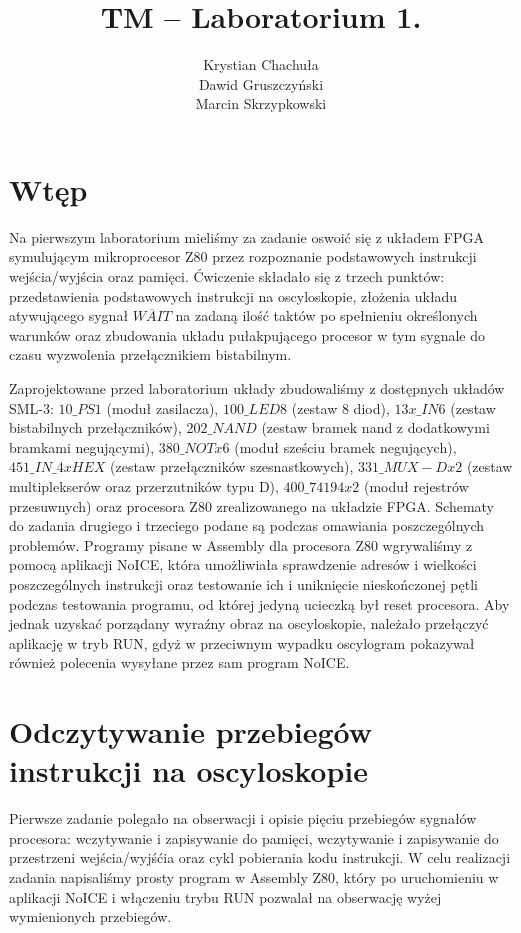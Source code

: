 \documentclass[fleqn]{article}
\title{TM -- Laboratorium 1.}
\author{Krystian Chachuła \\ Dawid Gruszczyński \\ Marcin Skrzypkowski}
\begin{document}
\maketitle

\setcounter{page}{0}
\thispagestyle{empty}

\pagebreak

\setcounter{page}{1}

\section{Wtęp}

Na pierwszym laboratorium mieliśmy za zadanie oswoić się z układem FPGA symulującym mikroprocesor Z80 przez rozpoznanie podstawowych instrukcji wejścia/wyjścia oraz pamięci. Ćwiczenie składało się z trzech punktów: przedstawienia podstawowych instrukcji na oscyloskopie, złożenia układu atywującego sygnał $\overline{WAIT}$ na zadaną ilość taktów po spełnieniu określonych warunków oraz zbudowania układu pułakpującego procesor w tym sygnale do czasu wyzwolenia przełącznikiem bistabilnym.

Zaprojektowane przed laboratorium układy zbudowaliśmy z dostępnych układów SML-3: ${10\_PS1}$ (moduł zasilacza), ${100\_LED8}$ (zestaw 8 diod), ${13x\_IN6}$ (zestaw bistabilnych przełączników), ${202\_NAND}$ (zestaw bramek nand z dodatkowymi bramkami negującymi), ${380\_NOTx6}$ (moduł sześciu bramek negujących), ${451\_IN\_4xHEX}$ (zestaw przełączników szesnastkowych), ${331\_MUX-Dx2}$ (zestaw multiplekserów oraz przerzutników typu D), ${400\_74194x2}$ (moduł rejestrów przesuwnych) oraz procesora Z80 zrealizowanego na układzie FPGA. Schematy do zadania drugiego i trzeciego podane są podczas omawiania poszczególnych problemów. Programy pisane w Assembly dla procesora Z80 wgrywaliśmy z pomocą aplikacji NoICE, która umożliwiała sprawdzenie adresów i wielkości poszczególnych instrukcji oraz testowanie ich i uniknięcie nieskończonej pętli podczas testowania programu, od której jedyną ucieczką był reset procesora. Aby jednak uzyskać porządany wyraźny obraz na oscyloskopie, należało przełączyć aplikację w tryb RUN, gdyż w przeciwnym wypadku oscylogram pokazywał również polecenia wysyłane przez sam program NoICE.



\section{Odczytywanie przebiegów instrukcji na oscyloskopie}
Pierwsze zadanie polegało na obserwacji i opisie pięciu przebiegów sygnałów procesora: wczytywanie i zapisywanie do pamięci, wczytywanie i zapisywanie do przestrzeni wejścia/wyjśćia oraz cykl pobierania kodu instrukcji.
W celu realizacji zadania napisaliśmy prosty program w Assembly Z80, który po uruchomieniu w aplikacji NoICE i włączeniu trybu RUN pozwalał na obserwację wyżej wymienionych przebiegów.
\end{document}
